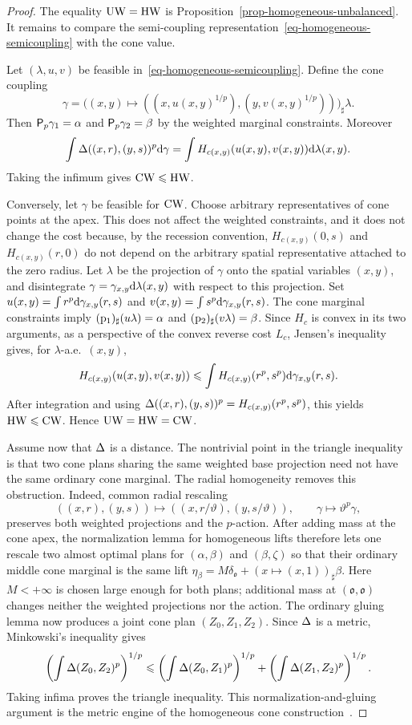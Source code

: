 \begin{proof}
	The equality $\operatorname{UW}=\operatorname{HW}$ is Proposition~\ref{prop-homogeneous-unbalanced}. It remains to compare the semi-coupling representation~\eqref{eq-homogeneous-semicoupling} with the cone value.

	Let $(\lambda,u,v)$ be feasible in~\eqref{eq-homogeneous-semicoupling}. Define the cone coupling
	\[
		\gamma
		=
		\big((x,y)\mapsto ((x,u(x,y)^{1/p}),(y,v(x,y)^{1/p}))\big)_\sharp\lambda.
	\]
	Then $\mathsf P_p\gamma_1=\alpha$ and $\mathsf P_p\gamma_2=\beta$ by the
	weighted marginal constraints. Moreover
	\[
		\int \Delta((x,r),(y,s))^p\mathrm{d}\gamma
		=
		\int H_{c(x,y)}(u(x,y),v(x,y))\mathrm{d}\lambda(x,y).
	\]
	Taking the infimum gives $\operatorname{CW}\leqslant\operatorname{HW}$.

	Conversely, let $\gamma$ be feasible for $\operatorname{CW}$. Choose arbitrary
	representatives of cone points at the apex. This does not affect the
	weighted constraints, and it does not change the cost because, by the
	recession convention, $H_{c(x,y)}(0,s)$ and $H_{c(x,y)}(r,0)$ do not depend
	on the arbitrary spatial representative attached to the zero radius. Let
	$\lambda$ be the projection of $\gamma$ onto the spatial variables
	$(x,y)$, and disintegrate
	$\gamma=\gamma_{x,y}\mathrm{d}\lambda(x,y)$ with respect to this projection. Set
	$u(x,y)=\int r^p\mathrm{d}\gamma_{x,y}(r,s)$ and $v(x,y)=\int s^p\mathrm{d}\gamma_{x,y}(r,s)$.
	The cone marginal constraints imply
	$(\mathrm{p}_1)_\sharp(u\lambda)=\alpha$ and
	$(\mathrm{p}_2)_\sharp(v\lambda)=\beta$. Since $H_c$ is convex in its two
	arguments, as a perspective of the convex reverse cost $L_c$, Jensen's
	inequality gives, for $\lambda$-a.e.\ $(x,y)$,
	\[
		H_{c(x,y)}(u(x,y),v(x,y))
		\leqslant
		\int H_{c(x,y)}(r^p,s^p)\mathrm{d}\gamma_{x,y}(r,s).
	\]
	After integration and using
	$\Delta((x,r),(y,s))^p=H_{c(x,y)}(r^p,s^p)$, this yields
	$\operatorname{HW}\leqslant\operatorname{CW}$. Hence $\operatorname{UW}=\operatorname{HW}=\operatorname{CW}$.

	Assume now that $\Delta$ is a distance. The nontrivial point in the triangle inequality is that two cone plans sharing the same weighted base projection need not have the same ordinary cone marginal. The radial homogeneity removes this obstruction. Indeed, common radial rescaling
	\[
		((x,r),(y,s))\mapsto((x,r/\vartheta),(y,s/\vartheta)),
		\qquad
		\gamma\mapsto\vartheta^p\gamma,
	\]
	preserves both weighted projections and the $p$-action. After adding mass at the cone apex, the normalization lemma for homogeneous lifts therefore lets one rescale two almost optimal plans for $(\alpha,\beta)$ and $(\beta,\zeta)$ so that their ordinary middle cone marginal is the same lift
	$\eta_\beta = M\delta_{\mathfrak o} + (x\mapsto(x,1))_\sharp\beta$.
	Here $M<+\infty$ is chosen large enough for both plans; additional mass at $(\mathfrak o,\mathfrak o)$ changes neither the weighted projections nor the action. The ordinary gluing lemma now produces a joint cone plan $(Z_0,Z_1,Z_2)$. Since $\Delta$ is a metric, Minkowski's inequality gives
	\[
		\left(\int\Delta(Z_0,Z_2)^p\right)^{1/p}
		\leqslant
		\left(\int\Delta(Z_0,Z_1)^p\right)^{1/p}
		+
		\left(\int\Delta(Z_1,Z_2)^p\right)^{1/p}.
	\]
	Taking infima proves the triangle inequality. This normalization-and-gluing argument is the metric engine of the homogeneous cone construction~\cite{LieroMielkeSavareLong}.


\end{proof}
